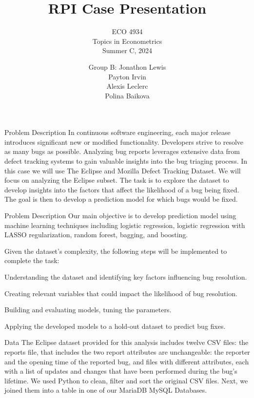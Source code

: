 \documentclass[10pt]{beamer}
\title{RPI Case Presentation}
\subtitle{ECO 4934 \\ Topics in Econometrics \\ Summer C, 2024}
\author{Group B: Jonathon Lewis \\ Payton Irvin \\ Alexis Leclerc \\ Polina Baikova}
\begin{document}
	
\begin{frame}
\titlepage
\end{frame}
	
	
\begin{frame}[t]{Problem Description}\justifying \vspace{20pt}
	In continuous software engineering, each major release introduces significant new or modified functionality. Developers strive to resolve as many bugs as possible. Analyzing bug reports leverages extensive data from defect tracking systems to gain valuable insights into the bug triaging process.
	\vskip 16pt
	In this case we will use The Eclipse and Mozilla Defect Tracking Dataset. We will focus on analyzing the Eclipse subset. The task is to explore the dataset to develop insights into the factors that affect the likelihood of a bug being fixed. The goal is then to develop a prediction model for which bugs would be fixed.
	
\end{frame}


\begin{frame}[t]{Problem Description}\justifying \vspace{2pt}
	Our main objective is to develop prediction model using machine learning techniques including logistic regression, logistic regression with LASSO regularization, random forest, bagging, and boosting.  
	
	Given the dataset’s complexity, the following steps will be implemented to complete the task: 
	\begin{description}[font=$\bullet$~\normalfont\scshape\color{red!50!black}]
		\item [Exploratory Data Analysis:] Understanding the dataset and identifying key factors influencing bug resolution.
		\item [Feature Engineering:] Creating relevant variables that could impact the likelihood of bug resolution.
		\item [Model Development:] Building and evaluating models, tuning the parameters. 
		\item [Model Predictions:] Applying the developed models to a hold-out dataset to predict bug fixes.
		
	\end{description}
\end{frame}


\begin{frame}[t]{Data}\justifying \vspace{20pt}
	The Eclipse dataset provided for this analysis includes twelve CSV files: the reports file, that includes the two report attributes are unchangeable: the reporter and the opening time of the reported bug, and files with different attributes, each with a list of updates and changes that have been performed during the bug's lifetime.
	\vskip 16pt  
	We used Python to clean, filter and sort the original CSV files. Next, we joined them into a table in one of our MariaDB MySQL Databases.  
\end{frame}
\end{document}
